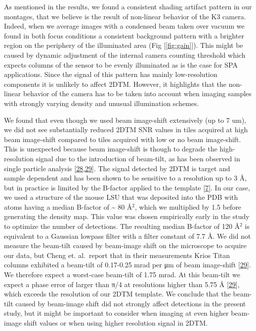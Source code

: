 \documentclass[
]{article}
\begin{document}
As mentioned in the results, we found a consistent shading artifact
pattern in our montages, that we believe is the result of non-linear
behavior of the K3 camera. Indeed, when we average images with a
condensed beam taken over vacuum we found in both focus conditions a
consistent background pattern with a brighter region on the periphery of
the illuminated area (Fig {[}\ref{fig:gain}{]}). This might be caused by dynamic
adjustment of the internal camera counting threshold which expects
columns of the sensor to be evenly illuminated as is the case for SPA
applications. Since the signal of this pattern has mainly low-resolution
components it is unlikely to affect 2DTM. However, it highlights that
the non-linear behavior of the camera has to be taken into account when
imaging samples with strongly varying density and unusual illumination
schemes.

We found that even though we used beam image-shift extensively (up to 7
um), we did not see substantially reduced 2DTM SNR values in tiles
acquired at high beam image-shift compared to tiles acquired with low or
no beam image-shift. This is unexpected because beam image-shift is
though to degrade the high-resolution signal due to the introduction of
beam-tilt, as has been observed in single particle analysis
{[}\protect\hyperlink{ref-44fG6kcy}{28},\protect\hyperlink{ref-wy8cRzrH}{29}{]}. The
signal detected by 2DTM is target and sample dependent and has been
shown to be sensitive to a resolution up to 3 Å, but in practice is
limited by the B-factor applied to the template
{[}\protect\hyperlink{ref-Ynb3IP6I}{7}{]}. In our case, we used a structure of the
mouse LSU that was deposited into the PDB with atoms having a median
B-factor of \textasciitilde{} 80 Å\(^2\), which we multiplied by 1.5 before generating
the density map. This value was chosen empirically early in the study to
optimize the number of detections. The resulting median B-factor of 120
Å\(^2\) is equivalent to a Gaussian lowpass filter with a filter constant
of 7.7 Å. We did not measure the beam-tilt caused by beam-image shift on
the microscope to acquire our data, but Cheng et. al.~report that in
their measurements Krios Titan columns exhibited a beam-tilt of
0.17-0.25 mrad per μm of beam image-shift
{[}\protect\hyperlink{ref-wy8cRzrH}{29}{]}. We therefore expect a worst-case
beam-tilt of 1.75 mrad. At this beam-tilt we expect a phase error of
larger than π/4 at resolutions higher than 5.75 Å
{[}\protect\hyperlink{ref-wy8cRzrH}{29}{]}, which exceeds the resolution of our
2DTM template. We conclude that the beam-tilt caused by beam-image shift
did not strongly affect detections in the present study, but it might be
important to consider when imaging at even higher beam-image shift
values or when using higher resolution signal in 2DTM.
\end{document}
